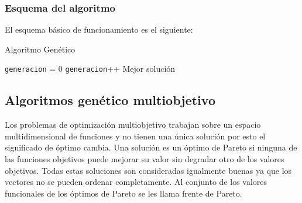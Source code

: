 \subsubsection{Esquema del algoritmo}

El esquema básico de funcionamiento es el siguiente:


\begin{algorithm}[H]
	\caption{Algoritmo Genético}
	\label{alg:algoritmo_genetico_simple}
	\begin{algorithmic} [1] 
		{
			\STATE \texttt{generacion} = 0
			\STATE \texttt{generacion}++
			\ENDWHILE
			\RETURN Mejor solución
		}
	\end{algorithmic}
\end{algorithm}



%
%


\subsection{Algoritmos genético multiobjetivo}

Los problemas de optimización multiobjetivo trabajan sobre un espacio multidimensional de funciones y no tienen una única solución por esto el significado de óptimo cambia. Una solución es un óptimo de Pareto si ninguna de las funciones objetivos puede mejorar su valor sin degradar otro de los valores objetivos. Todas estas soluciones son consideradas igualmente buenas ya que los vectores no se pueden ordenar completamente. Al conjunto de los valores funcionales de los óptimos de Pareto se les llama frente de Pareto.

